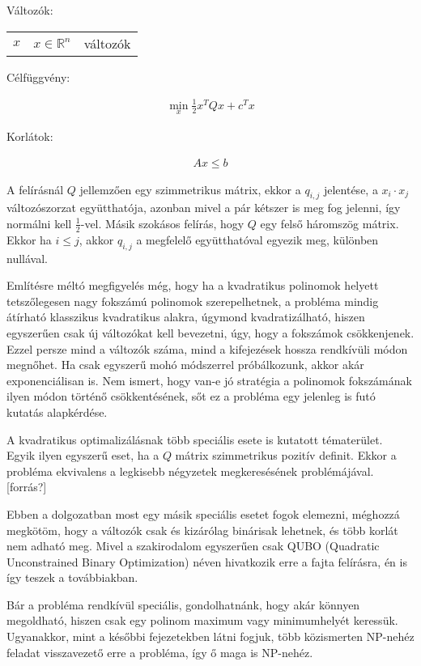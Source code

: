 Változók:

\begin{tabular}{lll}
	$x$ & $x \in \mathbb{R}^n$ & változók \\
\end{tabular}

Célfüggvény:

\begin{align}
	\min_{x} \frac{1}{2} x^T Q x + c^T x 
\end{align}

Korlátok:

\begin{align}
	Ax \leq b
\end{align}

A felírásnál $Q$ jellemzően egy szimmetrikus mátrix, ekkor a $q_{i,j}$ jelentése, a $x_i \cdot x_j$ változószorzat együtthatója, azonban mivel a pár kétszer is meg fog jelenni, így normálni kell $\frac{1}{2}$-vel. Másik szokásos felírás, hogy $Q$ egy felső háromszög mátrix. Ekkor ha $i \leq j$, akkor $q_{i,j}$ a megfelelő együtthatóval egyezik meg, különben nullával.

Említésre méltó megfigyelés még, hogy ha a kvadratikus polinomok helyett tetszőlegesen nagy fokszámú polinomok szerepelhetnek, a probléma mindig átírható klasszikus kvadratikus alakra, úgymond kvadratizálható, hiszen egyszerűen csak új változókat kell bevezetni, úgy, hogy a fokszámok csökkenjenek. Ezzel persze mind a változók száma, mind a kifejezések hossza rendkívüli módon megnőhet. Ha csak egyszerű mohó módszerrel próbálkozunk, akkor akár exponenciálisan is. Nem ismert, hogy van-e jó stratégia a polinomok fokszámának ilyen módon történő csökkentésének, sőt ez a probléma egy jelenleg is futó kutatás alapkérdése.

A kvadratikus optimalizálásnak több speciális esete is kutatott tématerület. Egyik ilyen egyszerű eset, ha a $Q$ mátrix szimmetrikus pozitív definit. Ekkor a probléma ekvivalens a legkisebb négyzetek megkeresésének problémájával. [forrás?]

Ebben a dolgozatban most egy másik speciális esetet fogok elemezni, méghozzá megkötöm, hogy a változók csak és kizárólag binárisak lehetnek, és több korlát nem adható meg. Mivel a szakirodalom egyszerűen csak QUBO (Quadratic Unconstrained Binary Optimization) néven hivatkozik erre a fajta felírásra, én is így teszek a továbbiakban\cite{enwiki:1020700695}.

Bár a probléma rendkívül speciális, gondolhatnánk, hogy akár könnyen megoldható, hiszen csak egy polinom maximum vagy minimumhelyét keressük. Ugyanakkor, mint a későbbi fejezetekben látni fogjuk, több közismerten NP-nehéz feladat visszavezető erre a probléma, így ő maga is NP-nehéz. 


